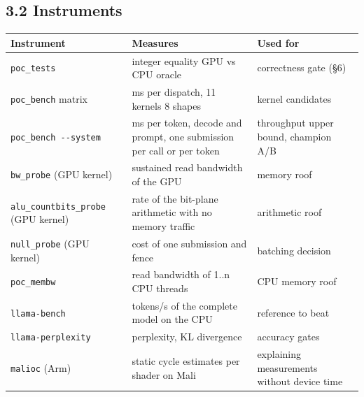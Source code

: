 \documentclass[
  10pt,
]{article}
\newcounter{none} %
\begin{document}
\subsection{3.2 Instruments}\label{instruments}

{\def\LTcaptype{none} %
\begin{longtable}[]{@{}
  >{\raggedright\arraybackslash}p{}
  >{\raggedright\arraybackslash}p{}
  >{\raggedright\arraybackslash}p{}@{}}
\toprule\noalign{}
\begin{minipage}[b]{\linewidth}\raggedright%
Instrument
\end{minipage} & \begin{minipage}[b]{\linewidth}\raggedright%
Measures
\end{minipage} & \begin{minipage}[b]{\linewidth}\raggedright%
Used for
\end{minipage} \\
\midrule\noalign{}
\endhead%
\bottomrule\noalign{}
\endlastfoot%
\texttt{poc\_tests} & integer equality GPU vs CPU oracle & correctness
gate (\S{}6) \\
\texttt{poc\_bench} matrix & ms per dispatch, 11 kernels \texttimes{} 8 shapes &
kernel candidates \\
\texttt{poc\_bench\ -{}-system} & ms per token, decode and prompt, one
submission per call or per token & throughput upper bound, champion
A/B \\
\texttt{bw\_probe} (GPU kernel) & sustained read bandwidth of the GPU &
memory roof \\
\texttt{alu\_countbits\_probe} (GPU kernel) & rate of the bit-plane
arithmetic with no memory traffic & arithmetic roof \\
\texttt{null\_probe} (GPU kernel) & cost of one submission and fence &
batching decision \\
\texttt{poc\_membw} & read bandwidth of 1..n CPU threads & CPU memory
roof \\
\texttt{llama-bench} & tokens/s of the complete model on the CPU &
reference to beat \\
\texttt{llama-perplexity} & perplexity, KL divergence & accuracy
gates \\
\texttt{malioc} (Arm) & static cycle estimates per shader on Mali &
explaining measurements without device time \\
\end{longtable}
}
\end{document}
